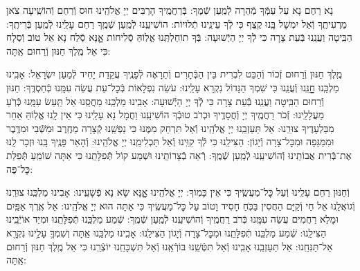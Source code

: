 \documentclass[twoside, openany, parskip=half, 11pt]{book}
\begin{document}
נָא רַחֶם נָא עַל עַמְּֿךָ מְֿהֵרָה לְֿמַֽעַן שְֿׁמֶךָ: בְּֿרַחֲמֶֽיךָ הָרַבִּים יְיָ אֱלֹהֵֽינוּ חוּס וְֿרַחֵם וְֿהוֹשִֽׁיעָה צֹאן מַרְעִיתֶֽךָ וְֿאַל יִמְשָׁל בָּֽנוּ קֶֽצֶף כִּי לְֿךָ עֵינֵֽינוּ תְֿלוּיוֹת: הוֹשִׁיעֵֽנוּ לְֿמַֽעַן שְֿׁמֶֽךָ רַחֵם עָלֵֽינוּ לְֿמַֽעַן בְּֿרִיתֶֽךָ: הַבִּֽיטָה וַעֲנֵֽנוּ בְּֿעֵת צָרָה כִּי לְֿךָ יְיָ הַיְֿשׁוּעָה: בְּֿךָ תוֹחַלְתֵּֽנוּ אֱלֽוֹהַּ סְֿלִיחוֹת אׇׇָנָּא סְֿלַח נָא אֵל טוֹב וְֿסַלָח כִּי אֵל מֶֽלֶךְ חַנּוּן וְֿרַחוּם אַֽתָּה:

מֶֽלֶךְ חַנּוּן וְֿרַחוּם זְֿכוֹר וְֿהַבֵּט לִבְרִית בֵּין הַבְּֿתָרִים וְֿתֵרָאֶה לְֿפָנֶֽיךָ עֲקֵדַת יָחִיד לְֿמַעַן יִשְׂרָאֵל: אָבִֽינוּ מַלְכֵּֽנוּ חׇׇׇׇָנֵּֽנוּ וְֿעֲנֵֽנוּ כִּי שִׁמְךָ הַגָּדוֹל נִקְרָא עָלֵֽינוּ: עֹשֵׂה נִפְלָאוֹת בְּֿכׇל־עֵת עֲשֵׂה עִמָּֽנוּ כְּֿחַסְדֶּֽךָ: חַנּוּן וְֿרַחוּם הַבִּֽיטָה וַעֲנֵֽנוּ בְּֿעֵת צָרָה כִּי לְֿךָ יְיָ הַיְֿשׁוּעָה: אָבִֽינוּ מַלְכֵּֽנוּ מַחֲסֵֽנוּ אַל תַּֽעַשׂ עִמָּֽנוּ כְּֿרֹֽעַ מַעֲלָלֵֽינוּ: זְֿכֹר רַחֲמֶֽיךָ יְיָ וְֿחֲסָדֶֽיךָ וּכְרֹב טוּבְֿךָ הוֹשִׁיעֵֽנוּ וַחֲמָל נָא עָלֵֽינוּ כִּי אֵין לָֽנוּ אֱלֽוֹהַּ אַחֵר מִבַּלְעָדֶיךָ צוּרֵֽנוּ: אַל תַּעַזְבֵֽנוּ יְיָ אֱלֹהֵֽינוּ וְֿאַל תִּרְחַק מִמֶּנּוּ כִּי נַפְשֵֽׁנוּ קְֿצָרָה מֵחֶֽרֶב וּמִשְּֿׁבִי וּמִדֶּֽבֶר וּמִמַּגֵּפָה וּמִכׇּל־צָרָה וְֿיָגוֹן: הַצִּילֵֽנוּ כִּי לְֿךָ קִוִּֽינוּ וְֿאַל תַּכְלִימֵֽנוּ יְיָ אֱלֹהֵֽינוּ: וְֿהָאֵר פָּנֶֽיךָ בָּֽנוּ וּזְכָר לָֽנוּ אֶת־בְּֿרִית אֲבוֹתֵֽינוּ וְֿהוֹשִׁיעֵֽנוּ לְֿמַֽעַן שְֿׁמֶֽךָ: רְֿאֵה בְֿצָרוֹתֵֽינוּ וּשְׁמַע קוֹל תְּֿפִלָּתֵֽנוּ כִּי אַתָּה שׁוֹמֵֽעַ תְּֿפִלַּת כׇּל־פֶּה:

וְֿחַנּוּן רַחֵם עָלֵֽינוּ וְֿעַל כׇּל־מַעֲשֶֽׂיךָ כִּי אֵין כָּמֽוֹךָ: יְיָ אֱלֹהֵֽינוּ אׇׇָנָּא שָׂא נָא פְֿשָׁעֵֽינוּ: אָבִינוּ מַלְכֵּֽנוּ צוּרֵֽנוּ וְֿגוֹאֲלֵֽנוּ אֵל חַי וְֿקַיָּם הַחֲסִין בַּכֹּֽחַ חָסִיד וָטוֹב עַל כׇּל־מַעֲשֶֽׂיךָ כִּי אַתָּה הוּא יְיָ אֱלֹהֵֽינוּ: אֵל אֶֽרֶךְ אַפַּֽיִם וּמָלֵא רַחֲמִים עֲשֵׂה עִמָּֽנוּ כְּֿרֹב רַחֲמֶֽיךָ וְֿהוֹשִׁיעֵֽנוּ לְֿמַֽעַן שְֿׁמֶֽךָ: שְֿׁמַע מַלְכֵּֽנוּ תְּֿפִלָּתֵֽנוּ וּמִיַד אוֹיְֿבֵֽינוּ הַצִּילֵֽנוּ: שְֿׁמַע מַלְכֵּֽנוּ תְּֿפִלָּתֵֽנוּ וּמִכׇּל־צָרָה וְֿיָגוֹן הַצִּילֵֽנוּ: אָבִֽינוּ מַלְכֵּֽנוּ אַֽתָּה וְשִׁמְךָ֛ עָלֵ֥ינוּ נִקְרָ֖א אַל־תַּנִּחֵֽנוּ: אַל תַּעַזְבֵֽנוּ אָבִֽינוּ וְֿאַל תִּטְּֿשֵֽׁנוּ בּוֹרְֿאֵֽנוּ וְֿאַל תִּשְׁכָּחֵֽנוּ יוֹצְֿרֵֽנוּ כִּי אֵל מֶֽלֶךְ חַנּוּן וְֿרַחוּם אַֽתָּה:
\end{document}

